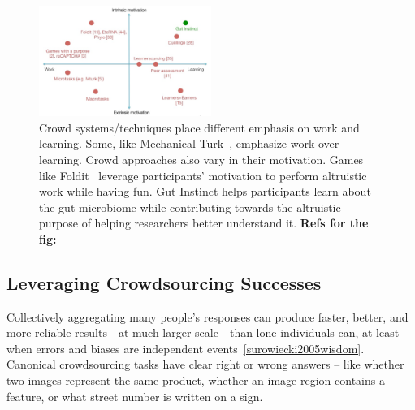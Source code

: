
\begin{figure}
  \centering
  \includegraphics[width=0.5\textwidth]{figures/gutinstinct/gi-2.png}
  \caption[Crowd systems/techniques place different emphasis on
work and learning]
{Crowd systems/techniques place different emphasis on
work and learning. Some, like Mechanical Turk~\cite{Amazon2016}, emphasize
work over learning. Crowd approaches also vary in their motivation.
Games like Foldit~\cite{Cooper2010} leverage participants’ motivation
to perform altruistic work while having fun. Gut Instinct helps
participants learn about the gut microbiome while contributing
towards the altruistic purpose of helping researchers better
understand it.    \textbf{Refs for the fig: ~\cite{Chen2016b}}}
  \label{fig:gi-2}
\end{figure}

\subsection{Leveraging Crowdsourcing Successes}
Collectively aggregating many people’s responses can produce faster, better, and more reliable results---at much larger scale---than lone individuals can, at least when errors and biases are independent events~\ref{surowiecki2005wisdom}. Canonical crowdsourcing tasks have clear right or wrong answers – like whether two images represent the same product, whether an image region contains a feature, or what street number is written on a sign.

